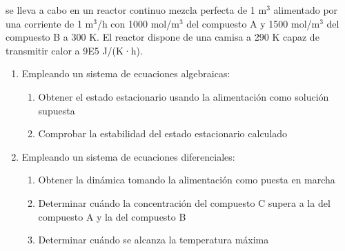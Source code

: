 \documentclass{report}
\begin{document}
\begin{raggedright}
{se lleva a cabo en un reactor continuo mezcla perfecta de 1 m$^3$ alimentado por una corriente de 1 m$^3$/h con 1000 mol/m$^3$ del compuesto A 
y 1500 mol/m$^3$ del compuesto B a 300 K. El reactor dispone de una camisa a 290 K capaz de transmitir calor a 9E5 J/(K·h).

\begin{enumerate}[label=\bfseries\scriptsize\protect\circled{\footnotesize\Alph*}]
	\item Empleando un sistema de ecuaciones algebraicas:
	 	\begin{enumerate}[label=\bfseries\tiny\protect\circled{\small\arabic*}]
			\item Obtener el estado estacionario usando la alimentación como solución supuesta
			\item Comprobar la estabilidad del estado estacionario calculado
		\end{enumerate}
	\item Empleando un sistema de ecuaciones diferenciales:
		\begin{enumerate}[label=\bfseries\tiny\protect\circled{\small\arabic*}]
			\item Obtener la dinámica tomando la alimentación como puesta en marcha 
			\item Determinar cuándo la concentración del compuesto C supera a la del compuesto A y la del compuesto B
			\item Determinar cuándo se alcanza la temperatura máxima
		\end{enumerate}
\end{enumerate}
}

\end{raggedright}
\end{document}
